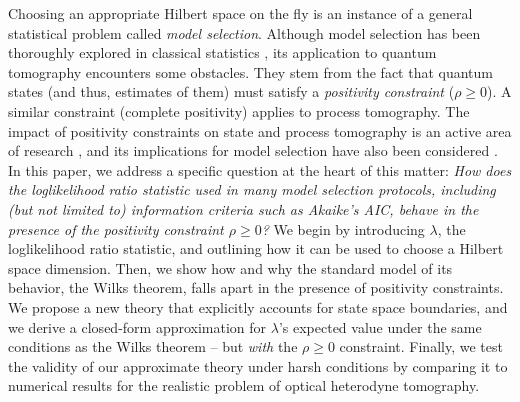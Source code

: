 \documentclass[aps,pra, twocolumn]{revtex4-1}
\begin{document}
Choosing an appropriate Hilbert space on the fly is an instance of a general statistical problem called \emph{model selection}.  Although model selection has been thoroughly explored in classical statistics \cite{Burnham2004}, its application to quantum tomography encounters some obstacles.  They stem from the fact that quantum states (and thus, estimates of them) must satisfy a \emph{positivity constraint} ($\rho\geq0$).  A similar constraint (complete positivity) applies to process tomography.  The impact of positivity constraints on state and process tomography is an active area of research \cite{Candes2006, Flammia2012a, Suess2016, Carpentier2015}, and its implications for model selection have also been considered \cite{Schwarz2013a, Guta2012a, VanEnk2013a, Langford2013, Yin2011, Moroder2013, Knips2015}.  In this paper, we address a specific question at the heart of this matter:  \emph{How does the loglikelihood ratio statistic used in many model selection protocols, including (but not limited to) information criteria such as Akaike's AIC, behave in the presence of the positivity constraint $\rho\geq0$?}  We begin by introducing $\lambda$, the loglikelihood ratio statistic, and outlining how it can be used to choose a Hilbert space dimension.  Then, we show how and why the standard model of its behavior, the Wilks theorem, falls apart in the presence of positivity constraints.  We propose a new theory that explicitly accounts for state space boundaries, and we derive a closed-form approximation for $\lambda$'s expected value under the same conditions as the Wilks theorem -- but \emph{with} the $\rho\geq0$ constraint.  Finally, we test the validity of our approximate theory under harsh conditions by comparing it to numerical results for the realistic problem of optical heterodyne tomography.
\end{document}
